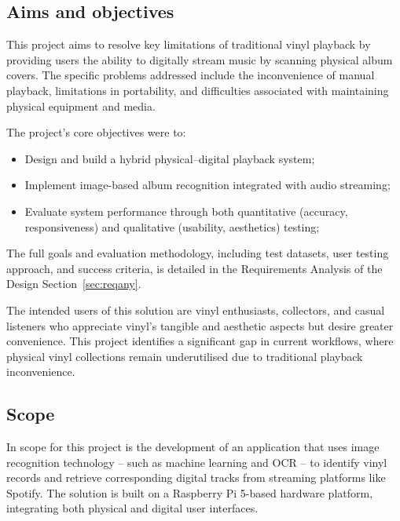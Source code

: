         \subsection{Aims and objectives}
    
            This project aims to resolve key limitations of traditional vinyl playback by providing users the ability to digitally stream music by scanning physical album covers. The specific problems addressed include the inconvenience of manual playback, limitations in portability, and difficulties associated with maintaining physical equipment and media.
    
            The project’s core objectives were to:
            \begin{itemize}
                \item Design and build a hybrid physical–digital playback system;
                \item Implement image-based album recognition integrated with audio streaming;
                \item Evaluate system performance through both quantitative (accuracy, responsiveness) and qualitative (usability, aesthetics) testing;
            \end{itemize}
    
            The full goals and evaluation methodology, including test datasets, user testing approach, and success criteria, is detailed in the Requirements Analysis of the Design Section~\ref{sec:reqany}.
    
            The intended users of this solution are vinyl enthusiasts, collectors, and casual listeners who appreciate vinyl's tangible and aesthetic aspects but desire greater convenience. This project identifies a significant gap in current workflows, where physical vinyl collections remain underutilised due to traditional playback inconvenience.
        
        \subsection{Scope}
    
            In scope for this project is the development of an application that uses image recognition technology -- such as machine learning and OCR -- to identify vinyl records and retrieve corresponding digital tracks from streaming platforms like Spotify. The solution is built on a Raspberry Pi 5-based hardware platform, integrating both physical and digital user interfaces.
    
